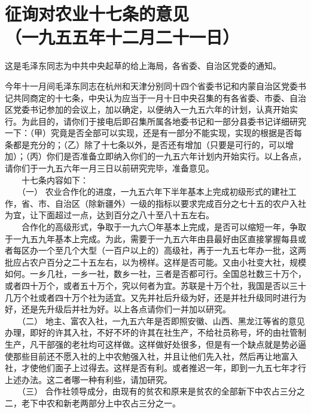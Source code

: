 \documentclass[cn,11pt,chinese]{elegantbook}
\def\myformat#1{\hfil\hfil #1}
\begin{document}
\section*{\myformat{征询对农业十七条的意见}\\\myformat{（一九五五年十二月二十一日）}}
\begin{introduction}\item  这是毛泽东同志为中共中央起草的给上海局，各省委、自治区党委的通知。\end{introduction}
今年十一月间毛泽东同志在杭州和天津分别同十四个省委书记和内蒙自治区党委书记共同商定的十七条，中央认为应当于一月十日中央召集的有各省委、市委、自治区党委书记参加的会议上，加以确定，以便纳入一九五六年的计划，认真开始实行。为此目的，请你们于接电后即召集所属各地委书记和一部分县委书记详细研究一下：（甲）究竟是否全部可以实现，还是有一部分不能实现，实现的根据是否每条都是充分的；（乙）除了十七条以外，是否还有增加（只要是可行的，可以增加）；（丙）你们是否准备立即纳入你们的一九五六年计划内开始实行。以上各点，请你们于一九五六年一月三日以前研究完毕，准备意见。\\
　　十七条内容如下：\\
　　（一） 农业合作化的进度，一九五六年下半年基本上完成初级形式的建社工作，省、市、自治区（除新疆外）一级的指标以要求完成百分之七十五的农户入社为宜，让下面超过一点，达到百分之八十至八十五左右。\\
　　合作化的高级形式，争取于一九六〇年基本上完成，是否可以缩短一年，争取于一九五九年基本上完成。为此，需要于一九五六年由县最好由区直接掌握每县或者每区办一个至几个大型（一百户以上的）高级社，再于一九五七年办一批，这两批应占农户百分之二十五左右，以为榜样。这样是否可能。又由小社变大社，规模如何。一乡几社，一乡一社，数乡一社，三者是否都可行。全国总社数三十万个，或者四十万个，或者五十万个，究以何者为宜。苏联是十万个社，我国是否以三十几万个社或者四十万个社为适宜。又先并社后升级为好，还是并社升级同时进行为好，还是先升级后并社为好。以上各点请你们一并加以研究。\\
　　（二） 地主、富农入社，一九五六年是否即照安徽、山西、黑龙江等省的意见办理，即好的许其入社，不好不坏的许其在社生产，不给社员称号，坏的由社管制生产，凡干部强的老社均可这样做。这样做好处很多，但是有一个缺点就是势必逼使那些目前还不愿入社的上中农勉强入社，并且让他们先入社，然后再让地富入社，才使他们面子上过得去。这样是否有利。或者推迟一年，即到一九五七年才行上述办法。这二者哪一种有利些，请加研究。\\
　　（三） 合作社领导成分，由现有的贫农和原来是贫农的全部新下中农占三分之二，老下中农和新老两部分上中农占三分之一。\\
\end{document}
